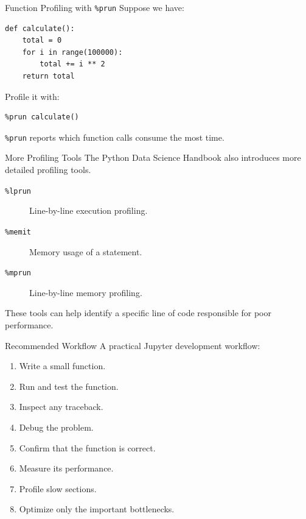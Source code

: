 \documentclass[aspectratio=169]{beamer}
\begin{document}
\begin{frame}[fragile]{Function Profiling with \texttt{\%prun}}
Suppose we have:

\begin{lstlisting}
def calculate():
    total = 0
    for i in range(100000):
        total += i ** 2
    return total
\end{lstlisting}

Profile it with:

\begin{lstlisting}
%prun calculate()
\end{lstlisting}

\texttt{\%prun} reports which function calls consume the most time.
\end{frame}

\begin{frame}{More Profiling Tools}
The Python Data Science Handbook also introduces more detailed
profiling tools.

\begin{description}
    \item[\texttt{\%lprun}] Line-by-line execution profiling.
    \item[\texttt{\%memit}] Memory usage of a statement.
    \item[\texttt{\%mprun}] Line-by-line memory profiling.
\end{description}

\vspace{0.4cm}

These tools can help identify a specific line of code responsible for
poor performance.
\end{frame}

\begin{frame}{Recommended Workflow}
A practical Jupyter development workflow:

\begin{enumerate}
    \item Write a small function.
    \item Run and test the function.
    \item Inspect any traceback.
    \item Debug the problem.
    \item Confirm that the function is correct.
    \item Measure its performance.
    \item Profile slow sections.
    \item Optimize only the important bottlenecks.
\end{enumerate}
\end{frame}
\end{document}
